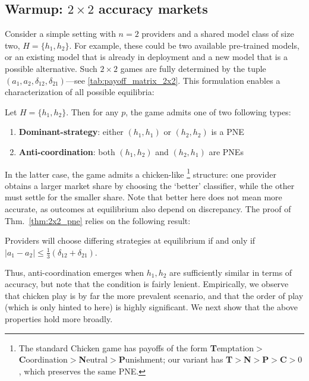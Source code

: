 \subsection{Warmup: $2 \times 2$ accuracy markets} \label{sec:2x2}
Consider a simple setting with $n=2$ providers and a shared model class of size two, $H=\{h_1,h_2\}$.
For example, these could be two available pre-trained models,
or an existing model that is already in deployment and a new model that is a possible alternative.
Such $2 \times 2$ games are fully determined by the tuple
$(a_1, a_2, \delta_{12}, \delta_{21})$---see \cref{tab:payoff_matrix_2x2}.
This formulation enables a characterization of all possible equilibria:
\squeeze
\begin{theorem}
\label{thm:2x2_pne}
Let $H = \{h_1,h_2\}$. Then for any $p$, 
the game admits one of two following types:
\begin{enumerate}[leftmargin=1.3em,topsep=0em,itemsep=0.1em]
\item \textbf{Dominant-strategy}: either $(h_1,h_1)$ or $(h_2,h_2)$ is a PNE
\item \textbf{Anti-coordination}: both $(h_1,h_2)$ and $(h_2,h_1)$ are PNEs 
\squeeze
\end{enumerate}
\end{theorem}
In the latter case, 
the game admits a chicken-like%
\footnote{The standard Chicken game has payoffs of the form
\textbf{T}emptation$>$\textbf{C}oordination$>$\textbf{N}eutral$>$\textbf{P}unishment;
our variant has
\textbf{T}$>$\textbf{N}$>$\textbf{P}$>$\textbf{C}$>0$,
which preserves the same PNE.
}
structure:
one provider obtains a larger market share by choosing the `better' classifier, while the other must settle for the smaller share.
Note that better here does not mean more accurate,
as outcomes at equilibrium also depend on discrepancy.
The proof of Thm.~\ref{thm:2x2_pne} relies on the following result:
\begin{lemma}
\label{lem:2x2_pne}
Providers will choose differing strategies at equilibrium if and only if
$|a_1-a_2| \le \frac{1}{3}(\delta_{12} + \delta_{21})$.
\end{lemma}
Thus, anti-coordination emerges when $h_1,h_2$ are sufficiently similar in terms of accuracy, but note that the condition is fairly lenient.
Empirically, we observe that chicken play
is by far the more prevalent scenario,
and that the order of play (which is only hinted to here) is highly significant.
We next show that the above properties hold more broadly.

